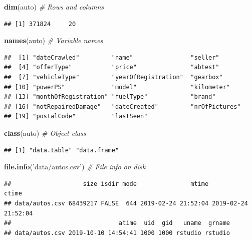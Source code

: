 \documentclass[]{book}
\newenvironment{Shaded}{\begin{snugshade}}{\end{snugshade}}
\newcommand{\CommentTok}[1]{\textcolor[rgb]{0.56,0.35,0.01}{\textit{#1}}}
\newcommand{\KeywordTok}[1]{\textcolor[rgb]{0.13,0.29,0.53}{\textbf{#1}}}
\newcommand{\NormalTok}[1]{#1}
\newcommand{\StringTok}[1]{\textcolor[rgb]{0.31,0.60,0.02}{#1}}
\theoremstyle{definition}
\theoremstyle{definition}
\theoremstyle{definition}
\theoremstyle{remark}
\begin{document}
\begin{Shaded}
\begin{Highlighting}[]
\KeywordTok{dim}\NormalTok{(auto) }\CommentTok{#  Rows and columns}
\end{Highlighting}
\end{Shaded}

\begin{verbatim}
## [1] 371824     20
\end{verbatim}

\begin{Shaded}
\begin{Highlighting}[]
\KeywordTok{names}\NormalTok{(auto) }\CommentTok{# Variable names}
\end{Highlighting}
\end{Shaded}

\begin{verbatim}
##  [1] "dateCrawled"         "name"                "seller"             
##  [4] "offerType"           "price"               "abtest"             
##  [7] "vehicleType"         "yearOfRegistration"  "gearbox"            
## [10] "powerPS"             "model"               "kilometer"          
## [13] "monthOfRegistration" "fuelType"            "brand"              
## [16] "notRepairedDamage"   "dateCreated"         "nrOfPictures"       
## [19] "postalCode"          "lastSeen"
\end{verbatim}

\begin{Shaded}
\begin{Highlighting}[]
\KeywordTok{class}\NormalTok{(auto) }\CommentTok{# Object class}
\end{Highlighting}
\end{Shaded}

\begin{verbatim}
## [1] "data.table" "data.frame"
\end{verbatim}

\begin{Shaded}
\begin{Highlighting}[]
\KeywordTok{file.info}\NormalTok{(}\StringTok{'data/autos.csv'}\NormalTok{) }\CommentTok{# File info on disk}
\end{Highlighting}
\end{Shaded}

\begin{verbatim}
##                    size isdir mode               mtime               ctime
## data/autos.csv 68439217 FALSE  644 2019-02-24 21:52:04 2019-02-24 21:52:04
##                              atime  uid  gid   uname  grname
## data/autos.csv 2019-10-10 14:54:41 1000 1000 rstudio rstudio
\end{verbatim}
\end{document}
